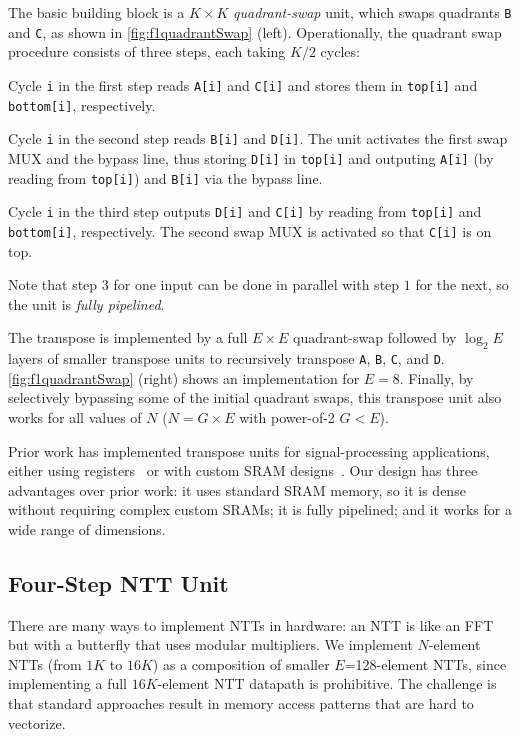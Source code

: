 The basic building block is a $K \times K$ \textit{quadrant-swap} unit, which
swaps quadrants \texttt{B} and \texttt{C}, as shown in
\autoref{fig:f1quadrantSwap} (left). Operationally, the quadrant swap procedure
consists of three steps, each taking $K/2$ cycles:
\begin{compactenum}
\item Cycle \texttt{i} in the first step reads \texttt{A[i]} and \texttt{C[i]}
    and stores them in \texttt{top[i]} and \texttt{bottom[i]}, respectively.
\item Cycle \texttt{i} in the second step reads \texttt{B[i]} and
    \texttt{D[i]}. The unit activates the first swap MUX and the bypass line,
    thus storing \texttt{D[i]} in \texttt{top[i]} and outputing \texttt{A[i]}
    (by reading from \texttt{top[i]}) and \texttt{B[i]} via the bypass line.
\item Cycle \texttt{i} in the third step outputs \texttt{D[i]} and
    \texttt{C[i]} by reading from \texttt{top[i]} and \texttt{bottom[i]},
    respectively. The second swap MUX is activated so that \texttt{C[i]} is on
    top.
\end{compactenum}

Note that step $3$ for one input can be done in parallel with step $1$ for the
next, so the unit is \emph{fully pipelined}.

The transpose is implemented by a full $E \times E$ quadrant-swap followed by
$\log_2E$ layers of smaller transpose units to recursively transpose
\texttt{A}, \texttt{B}, \texttt{C}, and \texttt{D}.
\autoref{fig:f1quadrantSwap} (right) shows an implementation for $E=8$.
Finally, by selectively bypassing some of the initial quadrant swaps, this
transpose unit also works for all values of $N$ ($N=G\times E$ with power-of-2
$G < E$).

Prior work has implemented transpose units for signal-processing applications,
either using registers~\cite{wang2018pipelined,zhang2020novel} or with custom
SRAM designs~\cite{shang2014single}. Our design has three advantages over prior
work: it uses standard SRAM memory, so it is dense without requiring complex
custom SRAMs; it is fully pipelined; and it works for a wide range of
dimensions.

\subsection{Four-Step NTT Unit}\label{sec:fourStepNTT}

There are many ways to implement NTTs in hardware: an NTT is like an
FFT~\cite{cooley:moc65:algorithm} but with a butterfly that uses modular
multipliers. We implement $N$-element NTTs (from $1K$ to $16K$) as a
composition of smaller $E$=128-element NTTs, since implementing a full
$16K$-element NTT datapath is prohibitive. The challenge is that standard
approaches result in memory access patterns that are hard to vectorize.

